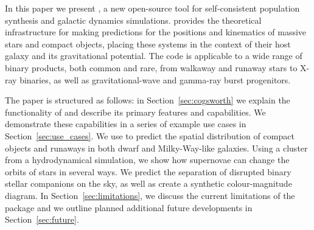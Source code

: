 \documentclass[twocolumn, twocolappendix, oneside]{aastex631}
\begin{document}


In this paper we present \cogsworth, a new open-source tool for self-consistent population synthesis and galactic dynamics simulations. \cogsworth provides the theoretical infrastructure for making predictions for the positions and kinematics of massive stars and compact objects, placing these systems in the context of their host galaxy and its gravitational potential. The code is applicable to a wide range of binary products, both common and rare, from walkaway and runaway stars to X-ray binaries, as well as gravitational-wave and gamma-ray burst progenitors.

The paper is structured as follows: in Section~\ref{sec:cogsworth} we explain the functionality of \cogsworth and describe its primary features and capabilities. We demonstrate these capabilities in a series of example use cases in Section~\ref{sec:use_cases}. We use \cogsworth to predict the spatial distribution of compact objects and runaways in both dwarf and Milky-Way-like galaxies. Using a cluster from a hydrodynamical simulation, we show how supernovae can change the orbits of stars in several ways. We predict the separation of disrupted binary stellar companions on the sky, as well as create a synthetic \gaia colour-magnitude diagram. In Section~\ref{sec:limitations}, we discuss the current limitations of the package and we outline planned additional future developments in Section~\ref{sec:future}.
\end{document}
